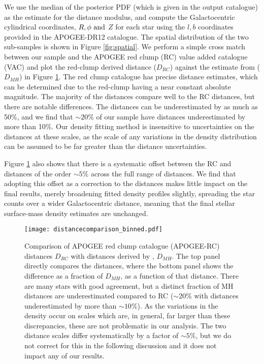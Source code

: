 We use the median of the posterior PDF (which is given in the output catalogue) as the estimate for the distance modulus, and compute the Galactocentric cylindrical coordinates, $R, \phi\ \rm{and}$  $Z$ for each star using the $l,b$ coordinates provided in the APOGEE-DR12 catalogue. The spatial distribution of the two \afe{} sub-samples is shown in Figure \ref{fig:spatial}. We perform a simple cross match between our sample and the APOGEE red clump (RC) value added catalogue (VAC) \citep{2014ApJ...790..127B} and plot the red-clump derived distance ($D_{RC}$) against the estimate from \citet{2014AJ....147..116H} ($D_{MH}$) in Figure \ref{fig:distcomp}. The red clump catalogue has precise distance estimates, which can be determined due to the red-clump having a near constant absolute magnitude. The majority of the \citet{2014AJ....147..116H}  distances compare well to the RC distances, but there are notable differences. The \citet{2014AJ....147..116H} distances can be underestimated by as much as 50\%, and we find that $\sim20\%$ of our sample have distances underestimated by more than 10\%. Our density fitting method is insensitive to uncertainties on the distances at these scales, as the scale of any variations in the density distribution can be assumed to be far greater than the distance uncertainties. 

Figure \ref{fig:distcomp} also shows that there is a systematic offset between the RC and \citet{2014AJ....147..116H} distances of the order $\sim 5\%$ across the full range of distances. We find that adopting this offset as a correction to the distances makes little impact on the final results, merely broadening fitted density profiles slightly, spreading the star counts over a wider Galactocentric distance, meaning that the final stellar surface-mass density estimates are unchanged.

\begin{figure}
	\texttt{[image: distancecomparison\_binned.pdf]}
    \caption{Comparison of APOGEE red clump catalogue (APOGEE-RC) distances $D_{RC}$ with distances derived by \citet{2015ApJ...808..132H}, $D_{MH}$. The top panel directly compares the distances, where the bottom panel shows the difference as a fraction of $D_{MH}$, as a function of that distance.  There are many stars with good agreement, but a distinct fraction of MH distances are underestimated compared to RC ($\sim 20\%$ with distances underestimated by more than $\sim 10\%$). As the variations in the density occur on scales which are, in general, far larger than these discrepancies, these are not problematic in our analysis. The two distance scales differ systematically by a factor of $\sim 5\%$, but we do not correct for this in the following discussion and it does not impact any of our results.}
    \label{fig:distcomp}
\end{figure}


